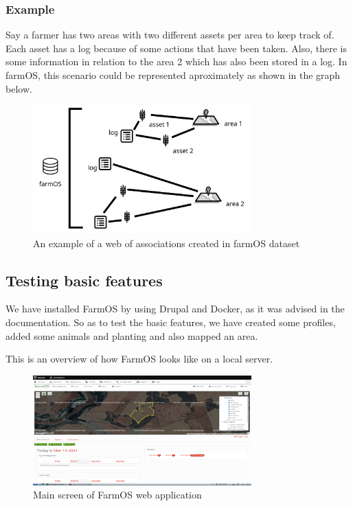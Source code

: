 \subsubsection*{Example}

Say a farmer has two areas with two different assets per area to keep track of. Each asset has a log because of some actions that have been taken. Also, there is some information in relation to the area 2 which has also been stored in a log. In farmOS, this scenario could be represented aproximately as shown in the graph below.

\begin{figure}[htp]
    \centering
    \includegraphics[width=0.75\textwidth]{fig/farmos-structure.png}
    \caption{An example of a web of associations created in farmOS dataset}
    \label{fig:farmos01}
\end{figure}

\newpage
\subsection{Testing basic features}

We have installed FarmOS by using Drupal and Docker, as it was advised in the documentation. So as to test the basic features, we have created some profiles, added some animals and planting and also mapped an area.

This is an overview of how FarmOS looks like on a local server.

\begin{figure}[htp]
    \centering
    \includegraphics[width=0.75\textwidth]{fig/tfg-farmos.png}
    \caption{Main screen of FarmOS web application}
    \label{fig:farmos}
\end{figure}



